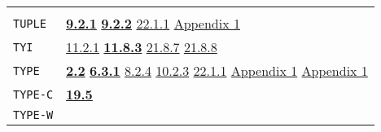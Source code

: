 \documentclass[a4paper,]{article}
\begin{document}
\begin{longtable}[]{@{}ll@{}}
\begin{minipage}[t]{0.70\columnwidth}
\end{minipage}\tabularnewline
\begin{minipage}[t]{0.24\columnwidth}\raggedright\strut
\texttt{TUPLE}\strut
\end{minipage} & \begin{minipage}[t]{0.70\columnwidth}\raggedright\strut
\textbf{\href{09-functions.md\#921-tuple-and-tuple-the-type-1}{9.2.1}}
\textbf{\href{09-functions.md\#922-tuple-the-subr-and-ituple}{9.2.2}}
\href{22-storage-management.md\#2211-stacks-and-other-internal-vectors}{22.1.1}
\href{appendix-1-a-look-inside.md\#appendix-1-a-look-inside}{Appendix 1}\strut
\end{minipage}\tabularnewline
\begin{minipage}[t]{0.24\columnwidth}\raggedright\strut
\texttt{TYI}\strut
\end{minipage} & \begin{minipage}[t]{0.70\columnwidth}\raggedright\strut
\href{11-input-output.md\#1121-open}{11.2.1} \textbf{\href{11-input-output.md\#1183-tyi}{11.8.3}}
\href{21-interrupts.md\#2187-blocked}{21.8.7} \href{21-interrupts.md\#2188-unblocked}{21.8.8}\strut
\end{minipage}\tabularnewline
\begin{minipage}[t]{0.24\columnwidth}\raggedright\strut
\texttt{TYPE}\strut
\end{minipage} & \begin{minipage}[t]{0.70\columnwidth}\raggedright\strut
\textbf{\href{02-read-evaluate-print.md\#22-philosophy-types-1}{2.2}} \textbf{\href{06-data-types.md\#631-type-1}{6.3.1}}
\href{08-truth.md\#824-object-properties-1}{8.2.4} \href{10-looping.md\#1023-examples-1}{10.2.3}
\href{22-storage-management.md\#2211-stacks-and-other-internal-vectors}{22.1.1}
\href{appendix-1-a-look-inside.md\#appendix-1-a-look-inside}{Appendix 1}
\href{appendix-1-a-look-inside.md\#basic-data-structures}{Appendix 1}\strut
\end{minipage}\tabularnewline
\begin{minipage}[t]{0.24\columnwidth}\raggedright\strut
\texttt{TYPE-C}\strut
\end{minipage} & \begin{minipage}[t]{0.70\columnwidth}\raggedright\strut
\textbf{\href{19-compiled-programs.md\#195-type-c-and-type-w}{19.5}}\strut
\end{minipage}\tabularnewline
\begin{minipage}[t]{0.24\columnwidth}\raggedright\strut
\texttt{TYPE-W}\strut
\end{minipage} & \begin{minipage}[t]{0.70\columnwidth}\raggedright\strut

\end{minipage}
\end{longtable}
\end{document}
